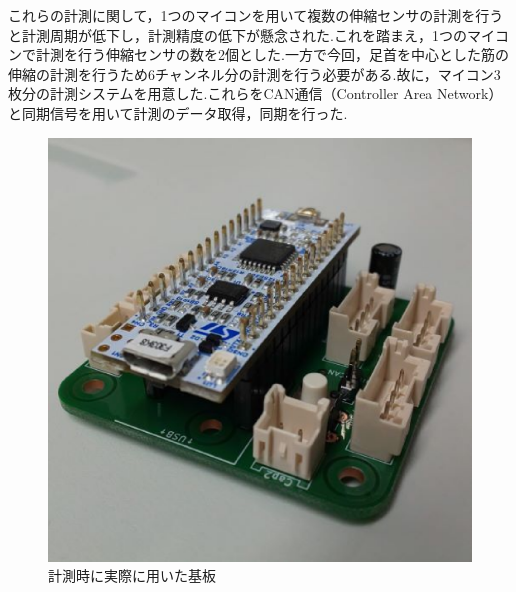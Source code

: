 これらの計測に関して，1つのマイコンを用いて複数の伸縮センサの計測を行うと計測周期が低下し，計測精度の低下が懸念された.これを踏まえ，1つのマイコンで計測を行う伸縮センサの数を2個とした.一方で今回，足首を中心とした筋の伸縮の計測を行うため6チャンネル分の計測を行う必要がある.故に，マイコン3枚分の計測システムを用意した.これらをCAN通信（Controller Area Network）と同期信号を用いて計測のデータ取得，同期を行った.
\begin{figure}[h]
 \begin{center}
  \includegraphics[width=0.5\columnwidth,clip]{Photo/2.実験方法/circuit.eps}
  \caption{計測時に実際に用いた基板}
  \label{circuit}
 \end{center}
\end{figure}